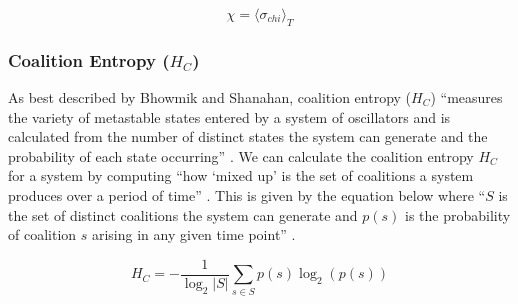 \documentclass[a4paper,11pt]{article}
\begin{document}
\begin{equation} \label{eq:chi}
\chi = \langle \sigma_{chi} \rangle_T
\end{equation}

\subsubsection{Coalition Entropy ($H_C$)} \label{sec:bg:hc}

As best described by Bhowmik and Shanahan, coalition entropy ($H_C$) ``measures the variety of metastable states entered by a system of oscillators and is calculated from the number of distinct states the system can generate and the probability of each state occurring'' \cite{Bhowmik2013}. We can calculate the coalition entropy $H_C$ for a system by computing ``how `mixed up' is the set of coalitions a system produces over a period of time'' \cite{Shanahan2010}. This is given by the equation below where ``$S$ is the set of distinct coalitions the system can generate and $p(s)$ is the probability of coalition $s$ arising in any given time point'' \cite{Shanahan2010}.

\begin{equation} \label{eq:hc}
H_C = - \frac{1}{\log_2 |S|}\sum_{s \in S}p(s) \log_2 (p(s))
\end{equation}

%

\end{document}
